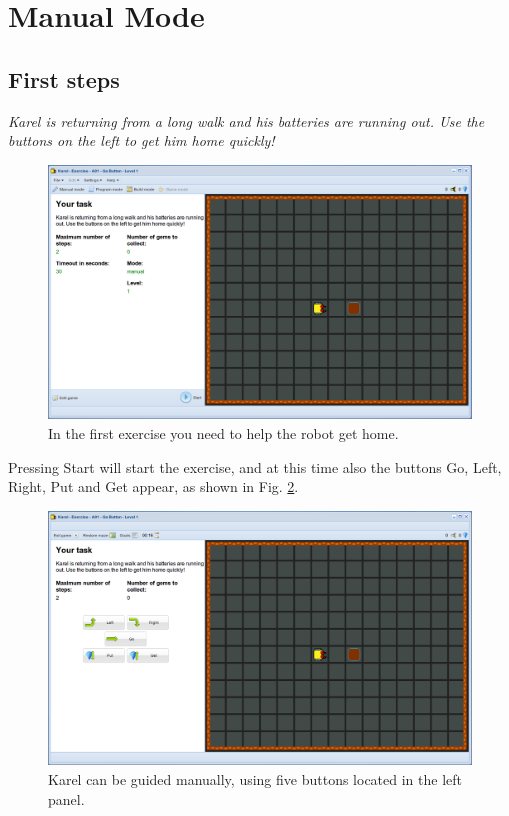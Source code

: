 
\section{Manual Mode}

\subsection{First steps}

{\em Karel is returning from a long walk and his batteries are running out. 
Use the buttons on the left to get him home quickly! }
\begin{figure}[!ht]
\begin{center}
\includegraphics[height=0.4\textwidth]{img/a01.png}
\end{center}
\vspace{-4mm}
\caption{In the first exercise you need to help the robot get home.}
\label{fig:a01}
\end{figure}

\noindent
Pressing Start will start 
the exercise, and at this time also the buttons Go, Left, Right, Put and Get appear, 
as shown in Fig. \ref{fig:a01b}.


\begin{figure}[!ht]
\begin{center}
\includegraphics[height=0.4\textwidth]{img/a01b.png}
\end{center}
\vspace{-4mm}
\caption{Karel can be guided manually, using five buttons located in the left panel.}
\label{fig:a01b}
\vspace{-10mm}
\end{figure}


